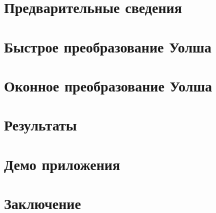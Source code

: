 \documentclass{matmex-diploma-custom}
\begin{document}
\section{Предварительные сведения}

\section{Быстрое преобразование Уолша}

\section{Оконное преобразование Уолша}

\section{Результаты}

\section{Демо приложения}

\section*{Заключение}



\end{document}
